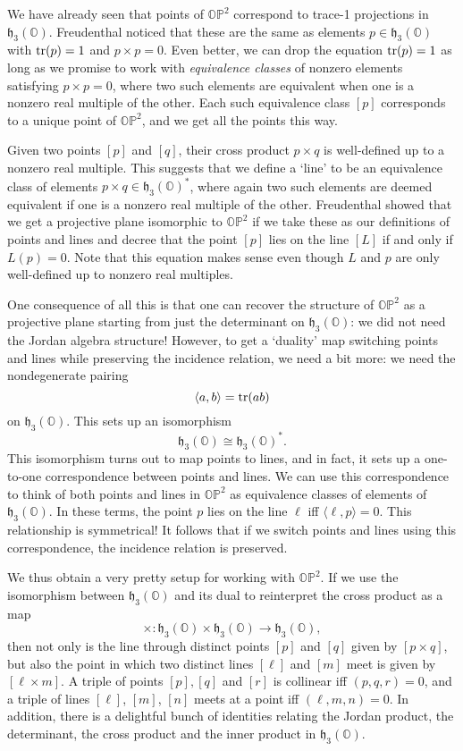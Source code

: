 \documentclass[12pt]{article}
\renewcommand\O{{\mathbb O}}
\newcommand\OP{{\mathbb {OP}}}
\newcommand{\h}{{\mathfrak {h}}}
\newcommand{\iso}{\cong}
\newcommand{\maps}{\colon}
\newcommand{\tr}{{\rm tr}}
\begin{document}
We have already seen that points of $\OP^2$ correspond to trace-1
projections in $\h_3(\O)$.  Freudenthal \cite{Freudenthal} noticed that
these are the same as elements $p \in \h_3(\O)$ with $\tr(p) = 1$ and $p
\times p = 0$.    Even better, we can drop the equation $\tr(p) = 1$ as
long as we promise to work with {\it equivalence classes} of nonzero 
elements satisfying $p \times p = 0$, where two such elements are
equivalent when one is a nonzero real multiple of the other.  Each
such equivalence class $[p]$ corresponds to a unique point of $\OP^2$,
and we get all the points this way.

Given two points $[p]$ and $[q]$, their cross product $p \times q$ is
well-defined up to a nonzero real multiple.  This suggests that we define
a `line' to be an equivalence class of elements $p \times q \in
\h_3(\O)^*$, where again two such elements are deemed equivalent if one
is a nonzero real multiple of the other.   Freudenthal showed that we
get a projective plane isomorphic to $\OP^2$ if we take these as our
definitions of points and lines and decree that the point $[p]$ lies on
the line $[L]$ if and only if $L(p) = 0$.   Note that this equation
makes sense even though $L$ and $p$ are only well-defined up to 
nonzero real multiples.

One consequence of all this is that one can recover the structure of
$\OP^2$ as a projective plane starting from just the determinant on
$\h_3(\O)$: we did not need the Jordan algebra structure!  However, to
get a `duality' map switching points and lines while preserving the
incidence relation, we need a bit more: we need the nondegenerate
pairing 
\[        \langle a,b \rangle =  \tr(ab)    \]
on $\h_3(\O)$.  This sets up an isomorphism 
\[        \h_3(\O) \iso \h_3(\O)^* . \]
This isomorphism turns out to map points to lines, and in fact, it sets
up a one-to-one correspondence between points and lines.  We can use
this correspondence to think of both points and lines in $\OP^2$ as
equivalence classes of elements of $\h_3(\O)$.  In these terms, the
point $p$ lies on the line $\ell$ iff $\langle \ell,p \rangle = 0$.  This
relationship is symmetrical!  It follows that if we switch points and
lines using this correspondence, the incidence relation is preserved.

We thus obtain a very pretty setup for working with $\OP^2$.  If we
use the isomorphism between $\h_3(\O)$ and its dual to reinterpret
the cross product as a map 
\[  \times \maps \h_3(\O) \times \h_3(\O) \to \h_3(\O) ,\]
then not only is the line through distinct points $[p]$ and $[q]$ given
by $[p \times q]$, but also the point in which two distinct lines
$[\ell]$ and $[m]$ meet is given by $[\ell \times m]$.  A 
triple of points $[p], [q]$ and $[r]$ is collinear iff $(p,q,r) = 0$,
and a triple of lines $[\ell]$, $[m]$, $[n]$ meets at a point iff
$(\ell,m,n) = 0$.  In addition, there is a delightful bunch of
identities relating the Jordan product, the determinant, the cross
product and the inner product in $\h_3(\O)$.  
\end{document}
